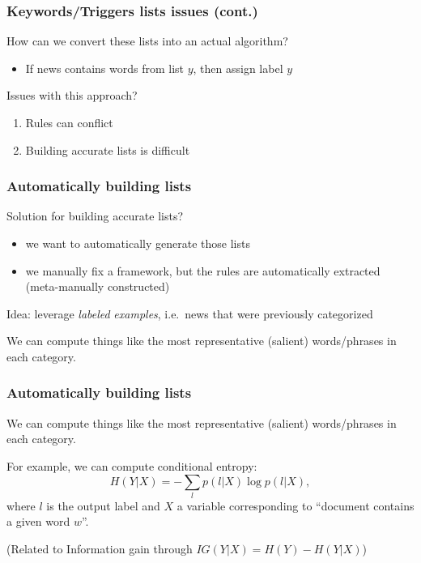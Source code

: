 \documentclass[usenames,dvipsnames]{beamer}
\newcommand{\voc}[1]{\emph{\color{ForestGreen}#1}}
\begin{document}
\begin{frame}\frametitle{Keywords/Triggers lists issues (cont.)}

How can we convert these lists into an actual algorithm?
\begin{itemize}
  \item If news contains words from list $y$, then assign label $y$
\end{itemize}

\vspace{0.4cm}
Issues with this approach?
\pause
\begin{enumerate}
  \item Rules can conflict
  \item Building accurate lists is difficult
\end{enumerate}
\end{frame}


\begin{frame}\frametitle{Automatically building lists}

Solution for building accurate lists?
\begin{itemize}
\item we want to automatically generate those lists
\item we manually fix a framework, but the rules are automatically
  extracted (meta-manually constructed)
\end{itemize}
\pause

\vspace{0.4cm}
Idea: leverage \voc{labeled} \voc{examples}, i.e.\ news that were
previously categorized

\vspace{0.4cm}
We can compute things like the most representative (salient)
words/phrases in each category.
\end{frame}

\begin{frame}\frametitle{Automatically building lists}

\vspace{0.4cm}
We can compute things like the most representative (salient)
words/phrases in each category.

For example, we can compute conditional entropy:
\begin{equation*}
H(Y|X) = - \sum_l p(l|X) \log p(l|X),
\end{equation*}
where $l$ is the output label and $X$ a variable corresponding to ``document contains a given word $w$''.

(Related to Information gain through $IG(Y|X) = H(Y) - H(Y|X)$)

\end{frame}
\end{document}
